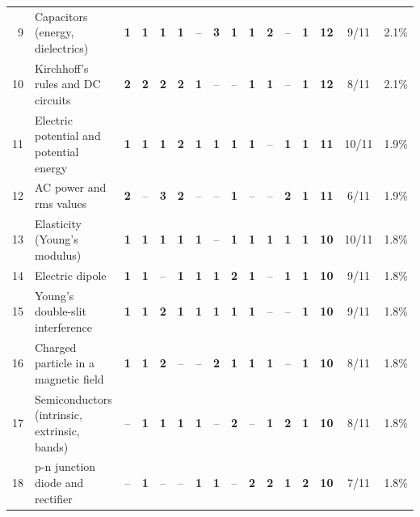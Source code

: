 \documentclass[10pt,a4paper]{article}
\begin{document}
{\begin{tabularx}{\linewidth}{@{}r>{\raggedright\arraybackslash}X*{11}{c}ccc@{}}
9 & Capacitors (energy, dielectrics) & \textbf{1} & \textbf{1} & \textbf{1} & \textbf{1} & {\color{gray!60}--} & \textbf{3} & \textbf{1} & \textbf{1} & \textbf{2} & {\color{gray!60}--} & \textbf{1} & \textbf{12} & 9/11 & 2.1\%\\
10 & Kirchhoff's rules and DC circuits & \textbf{2} & \textbf{2} & \textbf{2} & \textbf{2} & \textbf{1} & {\color{gray!60}--} & {\color{gray!60}--} & \textbf{1} & \textbf{1} & {\color{gray!60}--} & \textbf{1} & \textbf{12} & 8/11 & 2.1\%\\
11 & Electric potential and potential energy & \textbf{1} & \textbf{1} & \textbf{1} & \textbf{2} & \textbf{1} & \textbf{1} & \textbf{1} & \textbf{1} & {\color{gray!60}--} & \textbf{1} & \textbf{1} & \textbf{11} & 10/11 & 1.9\%\\
12 & AC power and rms values & \textbf{2} & {\color{gray!60}--} & \textbf{3} & \textbf{2} & {\color{gray!60}--} & {\color{gray!60}--} & \textbf{1} & {\color{gray!60}--} & {\color{gray!60}--} & \textbf{2} & \textbf{1} & \textbf{11} & 6/11 & 1.9\%\\
13 & Elasticity (Young's modulus) & \textbf{1} & \textbf{1} & \textbf{1} & \textbf{1} & \textbf{1} & {\color{gray!60}--} & \textbf{1} & \textbf{1} & \textbf{1} & \textbf{1} & \textbf{1} & \textbf{10} & 10/11 & 1.8\%\\
14 & Electric dipole & \textbf{1} & \textbf{1} & {\color{gray!60}--} & \textbf{1} & \textbf{1} & \textbf{1} & \textbf{2} & \textbf{1} & {\color{gray!60}--} & \textbf{1} & \textbf{1} & \textbf{10} & 9/11 & 1.8\%\\
15 & Young's double-slit interference & \textbf{1} & \textbf{1} & \textbf{2} & \textbf{1} & \textbf{1} & \textbf{1} & \textbf{1} & \textbf{1} & {\color{gray!60}--} & {\color{gray!60}--} & \textbf{1} & \textbf{10} & 9/11 & 1.8\%\\
16 & Charged particle in a magnetic field & \textbf{1} & \textbf{1} & \textbf{2} & {\color{gray!60}--} & {\color{gray!60}--} & \textbf{2} & \textbf{1} & \textbf{1} & \textbf{1} & {\color{gray!60}--} & \textbf{1} & \textbf{10} & 8/11 & 1.8\%\\
17 & Semiconductors (intrinsic, extrinsic, bands) & {\color{gray!60}--} & \textbf{1} & \textbf{1} & \textbf{1} & \textbf{1} & {\color{gray!60}--} & \textbf{2} & {\color{gray!60}--} & \textbf{1} & \textbf{2} & \textbf{1} & \textbf{10} & 8/11 & 1.8\%\\
18 & p-n junction diode and rectifier & {\color{gray!60}--} & \textbf{1} & {\color{gray!60}--} & {\color{gray!60}--} & \textbf{1} & \textbf{1} & {\color{gray!60}--} & \textbf{2} & \textbf{2} & \textbf{1} & \textbf{2} & \textbf{10} & 7/11 & 1.8\%\\

\end{tabularx}}
\end{document}
